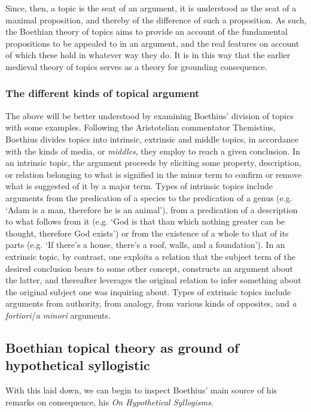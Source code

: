\documentclass[a4paper, 11pt]{article}
\begin{document}
Since, then, a topic is the seat of an argument, it is understood as the seat of a maximal proposition, and thereby of the difference of such a proposition. As such, the Boethian theory of topics aims to provide an account of the fundamental propositions to be appealed to in an argument, and the real features on account of which these hold in whatever way they do. It is in this way that the earlier medieval theory of topics serves as a theory for grounding consequence.

\subsubsection{The different kinds of topical argument}
The above will be better understood by examining Boethius' division of topics with some examples. Following the Aristotelian commentator Themistius, Boethius divides topics into intrinsic, extrinsic and middle topics, in accordance with the kinds of media, or \emph{middles}, they employ to reach a given conclusion. In an intrinsic topic, the argument proceeds by eliciting some property, description, or relation belonging to what is signified in the minor term to confirm or remove what is suggested of it by a major term. Types of intrinsic topics include arguments from the predication of a species to the predication of a genus (e.g. `Adam is a man, therefore he is an animal'), from a predication of a description to what follows from it (e.g. `God is that than which nothing greater can be thought, therefore God exists') or from the existence of a whole to that of its parts (e.g. `If there's a house, there's a roof, walls, and a foundation'). In an extrinsic topic, by contrast, one exploits a relation that the subject term of the desired conclusion bears to some other concept, constructs an argument about the latter, and thereafter leverages the original relation to infer something about the original subject one was inquiring about. Types of extrinsic topics include arguments from authority, from analogy, from various kinds of opposites, and \emph{a fortiori}/\emph{a minori} arguments.

\subsection{Boethian topical theory as ground of hypothetical syllogistic}
With this laid down, we can begin to inspect Boethius' main source of his remarks on consequence, his \emph{On Hypothetical Syllogisms}. 
\end{document}
